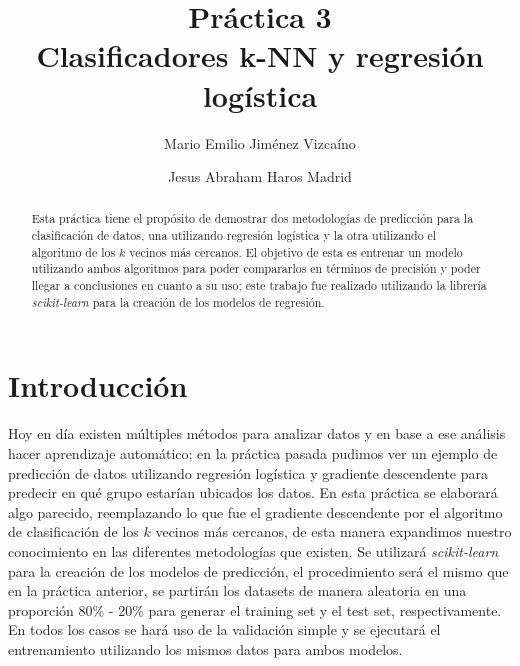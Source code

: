 \documentclass[sigconf,authorversion,nonacm]{acmart}
\begin{document}
\title{Práctica 3 \\ Clasificadores k-NN y regresión logística}

\author{Mario Emilio Jiménez Vizcaíno}

\author{Jesus Abraham Haros Madrid}


\begin{abstract}
Esta práctica tiene el propósito de demostrar dos metodologías de predicción para la clasificación de datos, una utilizando regresión logística y la otra utilizando el algoritmo de los $k$ vecinos más cercanos. El objetivo de esta es entrenar un modelo utilizando ambos algoritmos para poder compararlos en términos de precisión y poder llegar a conclusiones en cuanto a su uso; este trabajo fue realizado utilizando la librería \textit{scikit-learn} para la creación de los modelos de regresión.
\end{abstract}

\maketitle

\section{Introducción}
Hoy en día existen múltiples métodos para analizar datos y en base a ese análisis hacer aprendizaje automático; en la práctica pasada pudimos ver un ejemplo de predicción de datos utilizando regresión logística y gradiente descendente para predecir en qué grupo estarían ubicados los datos. En esta práctica se elaborará algo parecido, reemplazando lo que fue el gradiente descendente por el algoritmo de clasificación de los $k$ vecinos más cercanos, de esta manera expandimos nuestro conocimiento en las diferentes metodologías que existen.
Se utilizará \textit{scikit-learn} para la creación de los modelos de predicción, el procedimiento será el mismo que en la práctica anterior, se partirán los datasets de manera aleatoria en una proporción 80\% - 20\% para generar el training set y el test set, respectivamente. En todos los casos se hará uso de la validación simple y se ejecutará el entrenamiento utilizando los mismos datos para ambos modelos.
\end{document}
